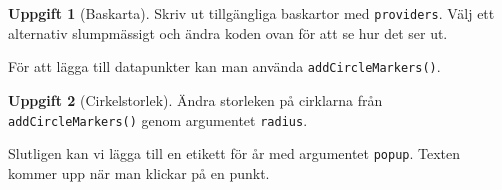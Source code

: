 \documentclass[
]{book}
\newenvironment{Shaded}{\begin{snugshade}}{\end{snugshade}}
\newcommand{\AttributeTok}[1]{\textcolor[rgb]{0.13,0.29,0.53}{#1}}
\newcommand{\DecValTok}[1]{\textcolor[rgb]{0.00,0.00,0.81}{#1}}
\newcommand{\FunctionTok}[1]{\textcolor[rgb]{0.13,0.29,0.53}{\textbf{#1}}}
\newcommand{\NormalTok}[1]{#1}
\newcommand{\SpecialCharTok}[1]{\textcolor[rgb]{0.81,0.36,0.00}{\textbf{#1}}}
\theoremstyle{definition}
\theoremstyle{definition}
\theoremstyle{definition}
\newtheorem{exercise}{Uppgift}[chapter]
\theoremstyle{definition}
\theoremstyle{remark}
\begin{document}
\begin{Shaded}
\end{Shaded}

\begin{exercise}[Baskarta]
Skriv ut tillgängliga baskartor med \texttt{providers}. Välj ett alternativ slumpmässigt och ändra koden ovan för att se hur det ser ut.
\end{exercise}

För att lägga till datapunkter kan man använda \texttt{addCircleMarkers()}.

\begin{Shaded}
\end{Shaded}

\begin{exercise}[Cirkelstorlek]
Ändra storleken på cirklarna från \texttt{addCircleMarkers()} genom argumentet \texttt{radius}.
\end{exercise}

Slutligen kan vi lägga till en etikett för år med argumentet \texttt{popup}. Texten kommer upp när man klickar på en punkt.

\begin{Shaded}
\end{Shaded}
\end{document}
